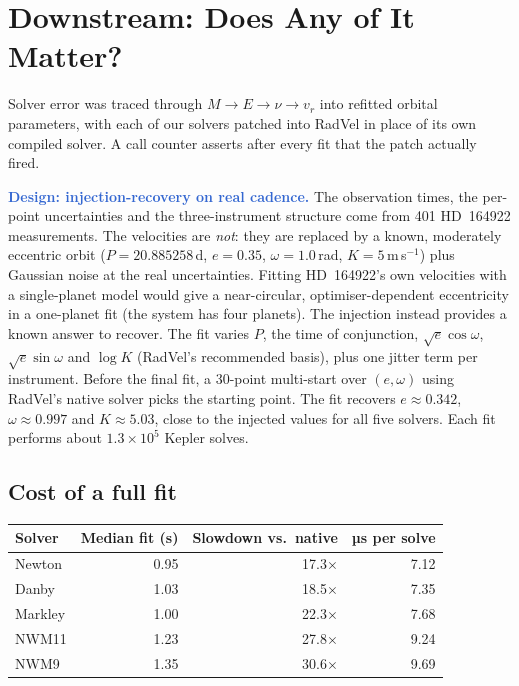 \documentclass[11pt,a4paper]{article}
\newcommand{\key}[1]{\textcolor{Highlight}{\bfseries #1}}
\begin{document}
\FloatBarrier
\section{Downstream: Does Any of It Matter?}
\label{sec:downstream}

Solver error was traced through $M \rightarrow E \rightarrow \nu
\rightarrow v_r$ into refitted orbital parameters, with each of our
solvers patched into RadVel in place of its own compiled solver. A call
counter asserts after every fit that the patch actually fired.

\key{Design: injection-recovery on real cadence.} The observation times,
the per-point uncertainties and the three-instrument structure come from
401 HD~164922 measurements. The velocities are
\emph{not}: they are replaced by a known, moderately eccentric orbit
($P = 20.885258$\,d, $e = 0.35$, $\omega = 1.0$\,rad, $K = 5$\,m\,s$^{-1}$)
plus Gaussian noise at the real uncertainties. Fitting HD~164922's own
velocities with a single-planet model would give a near-circular,
optimiser-dependent eccentricity in a one-planet fit (the system has four
planets). The injection instead provides a known answer to recover. The
fit varies $P$, the
time of conjunction, $\sqrt{e}\cos\omega$, $\sqrt{e}\sin\omega$ and
$\log K$ (RadVel's recommended basis), plus one jitter term per
instrument. Before the final fit, a 30-point multi-start over $(e,\omega)$
using RadVel's native solver picks the starting point. The fit recovers
$e\approx0.342$, $\omega\approx0.997$ and $K\approx5.03$, close to the
injected values for all five solvers. Each fit performs about
$1.3\times10^{5}$ Kepler solves.

\subsection{Cost of a full fit}

\begin{center}
\small
\begin{tabular}{@{}lrrr@{}}
\toprule
\textbf{Solver} & \textbf{Median fit (s)} & \textbf{Slowdown vs.\ native} & \textbf{µs per solve} \\
\midrule
Newton  & 0.95 & 17.3$\times$ & 7.12 \\
Danby   & 1.03 & 18.5$\times$ & 7.35 \\
Markley & 1.00 & 22.3$\times$ & 7.68 \\
NWM11   & 1.23 & 27.8$\times$ & 9.24 \\
NWM9    & 1.35 & 30.6$\times$ & 9.69 \\
\bottomrule
\end{tabular}
\end{center}
\end{document}
